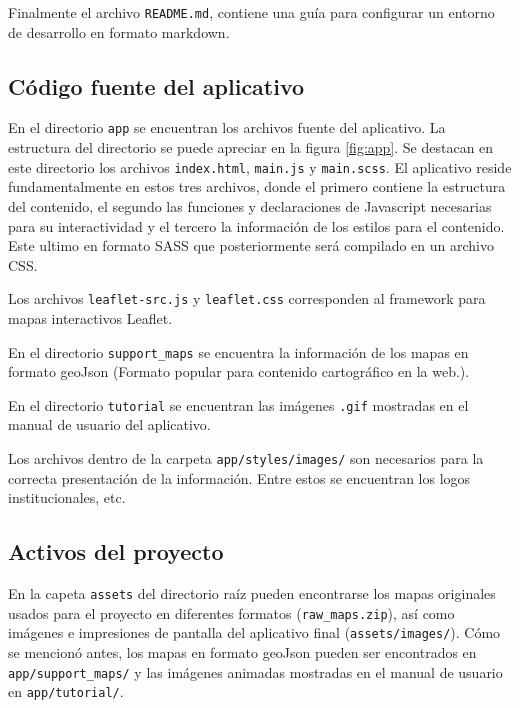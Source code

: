 \documentclass[11pt,letterpaper]{article}
\begin{document}
Finalmente el archivo {\tt README.md}, contiene una guía para configurar un entorno de desarrollo en formato markdown.

\subsection{Código fuente del aplicativo}

En el directorio {\tt app} se encuentran los archivos fuente del aplicativo. La estructura del directorio se puede apreciar en la figura \ref{fig:app}. Se destacan en este directorio los archivos {\tt index.html}, {\tt main.js} y {\tt main.scss}. El aplicativo reside fundamentalmente en estos tres archivos, donde el primero contiene la estructura del contenido, el segundo las funciones y declaraciones de Javascript necesarias para su interactividad y el tercero la información de los estilos para el contenido. Este ultimo en formato SASS \cite{sass} que posteriormente será compilado en un archivo CSS.

Los archivos {\tt leaflet-src.js} y {\tt leaflet.css} corresponden al framework para mapas interactivos Leaflet.

En el directorio {\tt support\_maps} se encuentra la información de los mapas en formato geoJson (Formato popular para contenido cartográfico en la web.). 

En el directorio {\tt tutorial} se encuentran las imágenes {\tt .gif} mostradas en el manual de usuario del aplicativo.

Los archivos dentro de la carpeta {\tt app/styles/images/} son necesarios para la correcta presentación de la información. Entre estos se encuentran los logos institucionales, etc.

\subsection{Activos del proyecto}

En la capeta {\tt assets} del directorio raíz pueden encontrarse los mapas originales usados para el proyecto en diferentes formatos ({\tt raw\_maps.zip}), así como imágenes e impresiones de pantalla del aplicativo final ({\tt assets/images/}). Cómo se mencionó antes, los mapas en formato geoJson pueden ser encontrados en {\tt app/support\_maps/} y las imágenes animadas mostradas en el manual de usuario en {\tt app/tutorial/}.
\end{document}
